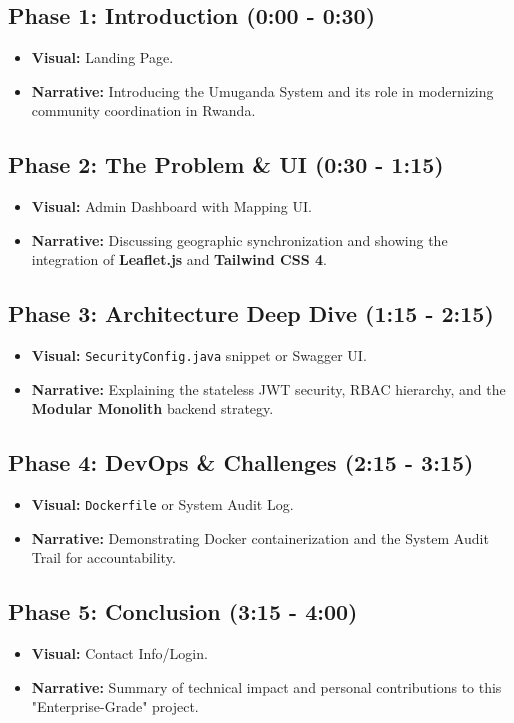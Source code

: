 \documentclass[11pt,a4paper]{article}
\begin{document}
\subsection{Phase 1: Introduction (0:00 - 0:30)}
\begin{itemize}
    \item \textbf{Visual:} Landing Page.
    \item \textbf{Narrative:} Introducing the Umuganda System and its role in modernizing community coordination in Rwanda.
\end{itemize}

\subsection{Phase 2: The Problem \& UI (0:30 - 1:15)}
\begin{itemize}
    \item \textbf{Visual:} Admin Dashboard with Mapping UI.
    \item \textbf{Narrative:} Discussing geographic synchronization and showing the integration of \textbf{Leaflet.js} and \textbf{Tailwind CSS 4}.
\end{itemize}

\subsection{Phase 3: Architecture Deep Dive (1:15 - 2:15)}
\begin{itemize}
    \item \textbf{Visual:} \texttt{SecurityConfig.java} snippet or Swagger UI.
    \item \textbf{Narrative:} Explaining the stateless JWT security, RBAC hierarchy, and the \textbf{Modular Monolith} backend strategy.
\end{itemize}

\subsection{Phase 4: DevOps \& Challenges (2:15 - 3:15)}
\begin{itemize}
    \item \textbf{Visual:} \texttt{Dockerfile} or System Audit Log.
    \item \textbf{Narrative:} Demonstrating Docker containerization and the System Audit Trail for accountability.
\end{itemize}

\subsection{Phase 5: Conclusion (3:15 - 4:00)}
\begin{itemize}
    \item \textbf{Visual:} Contact Info/Login.
    \item \textbf{Narrative:} Summary of technical impact and personal contributions to this "Enterprise-Grade" project.
\end{itemize}
\end{document}
